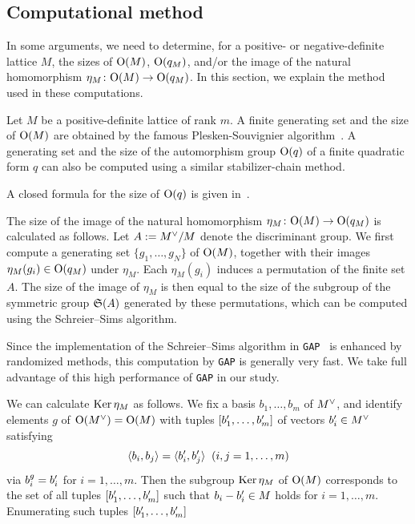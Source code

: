 \documentclass{amsart} %
\begin{document}
\subsection{Computational method}\label{subsec:computational}
%
In some arguments, 
we need to determine, for a positive- or negative-definite lattice $M$,  the sizes of $\mathord{\mathrm{O}}(M)$,
$\mathord{\mathrm{O}}(q_M)$, and/or 
the image of the natural homomorphism
$\eta_M\colon \mathord{\mathrm{O}}(M) \to \mathord{\mathrm{O}}(q_M)$.
In this section, we explain the method used in these computations.
%
\par
%
Let $M$ be a positive-definite lattice of rank $m$.
A finite generating set 
and the size of $\mathord{\mathrm{O}}(M)$ are obtained by the famous Plesken-Souvignier algorithm~\cite{MR1484483}.
A generating set and the size of the automorphism group $\mathord{\mathrm{O}}(q)$ of a finite quadratic form 
$q$ can also be computed using a similar stabilizer-chain method.
%
\begin{remark}
A closed formula for the size of $\mathord{\mathrm{O}}(q)$ is given in~\cite[Theorem 5.2]{MR4730253}.
\end{remark}
%
%
The size of the image of 
the natural homomorphism $\eta_M\colon \mathord{\mathrm{O}}(M)\to \mathord{\mathrm{O}}(q_M)$ is calculated as follows.
Let $A:=M^{\vee}/M$ denote the discriminant group.
We first compute a generating set $\{g_1, \dots, g_N\}$ of $\mathord{\mathrm{O}}(M)$,
together with their images $\eta_M(g_i)\in \mathord{\mathrm{O}}(q_M)$ under $\eta_M$.
Each $\eta_M(g_i)$ induces a permutation of the finite set $A$.
The size of the image of $\eta_M$ is 
then equal to the size of the subgroup of 
the symmetric group $\mathord{\mathfrak{S}}(A)$ generated by these permutations,
which can be computed using the Schreier--Sims algorithm.
%
\begin{remark}\label{rem:GAPadvantage}
Since the implementation of the Schreier--Sims algorithm in {\tt GAP}~\cite{GAP4} is enhanced by randomized methods,
this computation by {\tt GAP} is generally very fast.
We take full advantage of this high performance of {\tt GAP} in our study.
\end{remark}
%
We can calculate  $\operatorname{Ker} \eta_M$
as follows.
We fix a basis 
$b_1, \dots, b_{m}$ of $M^{\vee}$, 
and identify elements $g$ of $\mathord{\mathrm{O}}(M^{\vee})=\mathord{\mathrm{O}}(M)$
with tuples $[b_1^{\prime}, \dots, b_{m}^{\prime}]$ of vectors 
$b_i^{\prime}\in M^{\vee}$
satisfying
\[
\langle b_i, b_j \rangle=\langle b_i^{\prime}, b_j^{\prime} \rangle \;\;(i, j=1, \dots, m)
\]
via $b_i^g=b_i^{\prime}$ for $i=1, \dots, m$.
Then 
the subgroup
$\operatorname{Ker} \eta_M$ of $\mathord{\mathrm{O}}(M)$
corresponds to the set of 
all tuples $[b_1^{\prime}, \dots, b_{m}^{\prime}]$
such that $b_i-b_i^{\prime}\in M$ holds for $i=1, \dots, m$.
Enumerating such tuples $[b_1^{\prime}, \dots, b_{m}^{\prime}]$
\end{document}
